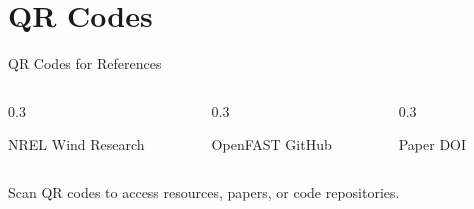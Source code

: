 \section{QR Codes}

\begin{frame}{QR Codes for References}
    \begin{columns}[T]
        \begin{column}{0.3\textwidth}
            \centering

            \vspace{0.2cm}
            {\small NREL Wind Research}
        \end{column}
        \begin{column}{0.3\textwidth}
            \centering

            \vspace{0.2cm}
            {\small OpenFAST GitHub}
        \end{column}
        \begin{column}{0.3\textwidth}
            \centering

            \vspace{0.2cm}
            {\small Paper DOI}
        \end{column}
    \end{columns}

    \vspace{0.5cm}

    {\small Scan QR codes to access resources, papers, or code repositories.}
\end{frame}

